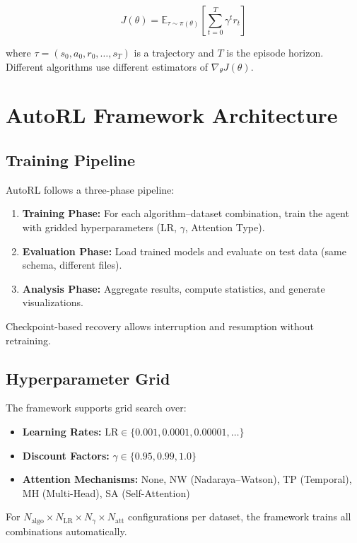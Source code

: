 \documentclass[11pt]{article}
\begin{document}
\begin{equation}
J(\theta) = \mathbb{E}_{\tau \sim \pi(\theta)} \left[ \sum_{t=0}^{T} \gamma^t r_t \right]
\end{equation}

where $\tau = (s_0, a_0, r_0, \dots, s_T)$ is a trajectory and $T$ is the episode horizon. Different algorithms use different estimators of $\nabla_\theta J(\theta)$.

\section{AutoRL Framework Architecture}

\subsection{Training Pipeline}
AutoRL follows a three-phase pipeline:
\begin{enumerate}
\item \textbf{Training Phase:} For each algorithm--dataset combination, train the agent with gridded hyperparameters (LR, $\gamma$, Attention Type).
\item \textbf{Evaluation Phase:} Load trained models and evaluate on test data (same schema, different files).
\item \textbf{Analysis Phase:} Aggregate results, compute statistics, and generate visualizations.
\end{enumerate}

Checkpoint-based recovery allows interruption and resumption without retraining.

\subsection{Hyperparameter Grid}
The framework supports grid search over:
\begin{itemize}
\item \textbf{Learning Rates:} $\text{LR} \in \{0.001, 0.0001, 0.00001, \dots\}$
\item \textbf{Discount Factors:} $\gamma \in \{0.95, 0.99, 1.0\}$
\item \textbf{Attention Mechanisms:} None, NW (Nadaraya--Watson), TP (Temporal), MH (Multi-Head), SA (Self-Attention)
\end{itemize}

For $N_{\text{algo}} \times N_{\text{LR}} \times N_\gamma \times N_{\text{att}}$ configurations per dataset, the framework trains all combinations automatically.
\end{document}
